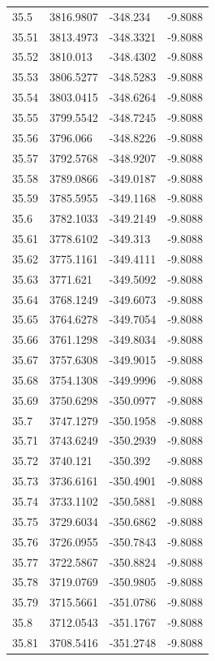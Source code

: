 \begin{table}[H]
\begin{tabular}{llll}
35.5 & 3816.9807 & -348.234 & -9.8088 \\
35.51 & 3813.4973 & -348.3321 & -9.8088 \\
35.52 & 3810.013 & -348.4302 & -9.8088 \\
35.53 & 3806.5277 & -348.5283 & -9.8088 \\
35.54 & 3803.0415 & -348.6264 & -9.8088 \\
35.55 & 3799.5542 & -348.7245 & -9.8088 \\
35.56 & 3796.066 & -348.8226 & -9.8088 \\
35.57 & 3792.5768 & -348.9207 & -9.8088 \\
35.58 & 3789.0866 & -349.0187 & -9.8088 \\
35.59 & 3785.5955 & -349.1168 & -9.8088 \\
35.6 & 3782.1033 & -349.2149 & -9.8088 \\
35.61 & 3778.6102 & -349.313 & -9.8088 \\
35.62 & 3775.1161 & -349.4111 & -9.8088 \\
35.63 & 3771.621 & -349.5092 & -9.8088 \\
35.64 & 3768.1249 & -349.6073 & -9.8088 \\
35.65 & 3764.6278 & -349.7054 & -9.8088 \\
35.66 & 3761.1298 & -349.8034 & -9.8088 \\
35.67 & 3757.6308 & -349.9015 & -9.8088 \\
35.68 & 3754.1308 & -349.9996 & -9.8088 \\
35.69 & 3750.6298 & -350.0977 & -9.8088 \\
35.7 & 3747.1279 & -350.1958 & -9.8088 \\
35.71 & 3743.6249 & -350.2939 & -9.8088 \\
35.72 & 3740.121 & -350.392 & -9.8088 \\
35.73 & 3736.6161 & -350.4901 & -9.8088 \\
35.74 & 3733.1102 & -350.5881 & -9.8088 \\
35.75 & 3729.6034 & -350.6862 & -9.8088 \\
35.76 & 3726.0955 & -350.7843 & -9.8088 \\
35.77 & 3722.5867 & -350.8824 & -9.8088 \\
35.78 & 3719.0769 & -350.9805 & -9.8088 \\
35.79 & 3715.5661 & -351.0786 & -9.8088 \\
35.8 & 3712.0543 & -351.1767 & -9.8088 \\
35.81 & 3708.5416 & -351.2748 & -9.8088 \\

\end{tabular}
\end{table}
